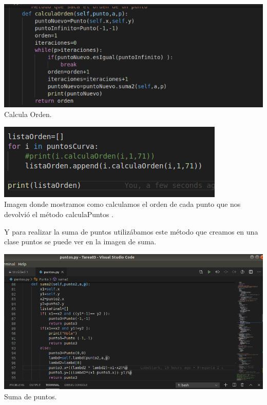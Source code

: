 \documentclass[10pt,a4paper]{article}
\begin{document}
\begin{enumerate}
\begin{itemize}
\begin{center}
\includegraphics[scale=.5]{img/orden.png}
\\Calcula Orden.
\end{center}
\begin{center}
\includegraphics[scale=.5]{img/sacandoOrden.png}
\\Imagen donde mostramos como calculamos el orden de cada punto que nos devolvió el método calculaPuntos  .
\end{center}
Y para realizar la suma de puntos utilizábamos este método que creamos en una clase puntos se puede ver en la imagen de suma.\\
\begin{center}
\includegraphics[scale=0.4]{img/suma.png}
\\Suma de puntos.
\end{center}



\end{itemize}
\end{enumerate}
\end{document}

